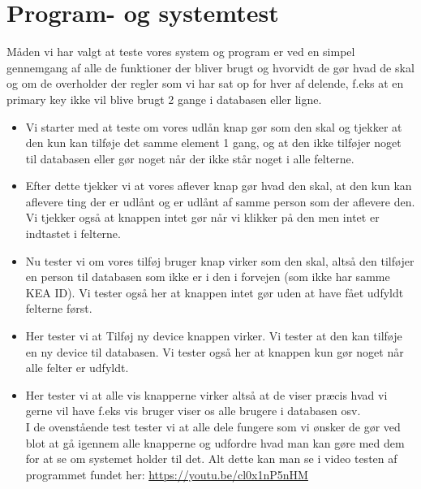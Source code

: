 \documentclass[a4paper]{article}
\begin{document}
\section{Program- og systemtest}
Måden vi har valgt at teste vores system og program er ved en simpel gennemgang af alle de funktioner der bliver brugt og hvorvidt de gør hvad de skal og om de overholder der regler som vi har sat op for hver af delende, f.eks at en primary key ikke vil blive brugt 2 gange i databasen eller ligne.\\[0.2in]
\begin{itemize}
	\item Vi starter med at teste om vores udlån knap gør som den skal og tjekker at den kun kan tilføje det samme element 1 gang, og at den ikke tilføjer noget til databasen eller gør noget når der ikke står noget i alle felterne.
	\item Efter dette tjekker vi at vores aflever knap gør hvad den skal, at den kun kan aflevere ting der er udlånt og er udlånt af samme person som der aflevere den. Vi tjekker også at knappen intet gør når vi klikker på den men intet er indtastet i felterne.
	\item Nu tester vi om vores tilføj bruger knap virker som den skal, altså den tilføjer en person til databasen som ikke er i den i forvejen (som ikke har samme KEA ID). Vi tester også her at knappen intet gør uden at have fået udfyldt felterne først.
	\item Her tester vi at Tilføj ny device knappen virker. Vi tester at den kan tilføje en ny device til databasen. Vi tester også her at knappen kun gør noget når alle felter er udfyldt.
	\item Her tester vi at alle vis knapperne virker altså at de viser præcis hvad vi gerne vil have f.eks vis bruger viser os alle brugere i databasen osv.\\[0.1in]
I de ovenstående test tester vi at alle dele fungere som vi ønsker de gør ved blot at gå igennem alle knapperne og udfordre hvad man kan gøre med dem for at se om systemet holder til det. Alt dette kan man se i video testen af programmet fundet her: \url{https://youtu.be/cl0x1nP5nHM}\\
\end{itemize}
\pagebreak
\end{document}
